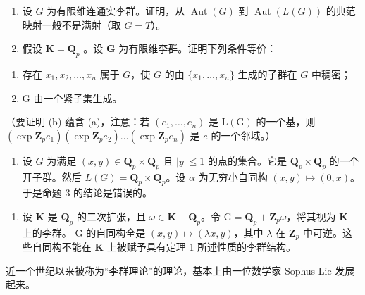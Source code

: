 
\begin{enumerate}
\def\labelenumi{\arabic{enumi}.}
\item
  设 \(G\) 为有限维连通实李群。证明，从 \(\operatorname{Aut}(G)\) 到 \(\operatorname{Aut}(L(G))\) 的典范映射一般不是满射（取 \(G = T\)）。
\item
  假设 \(\mathbf{K} = \mathbf{Q}_p\) 。设 \(\mathbf{G}\) 为有限维李群。证明下列条件等价：
\end{enumerate}

\begin{enumerate}
\def\labelenumi{(\alph{enumi})}
\item
  存在 \(x_{1}, x_{2}, \ldots, x_{n}\) 属于 \(G\)，使 \(G\) 的由 \(\{x_{1}, \ldots, x_{n}\}\) 生成的子群在 \(G\) 中稠密；
\item
  G 由一个紧子集生成。
\end{enumerate}

（要证明 (b) 蕴含 (a)，注意：若 \((e_1, \ldots, e_n)\) 是 \(\mathrm{L}(\mathrm{G})\) 的一个基，则 \((\exp \mathbf{Z}_p e_1)(\exp \mathbf{Z}_p e_2) \ldots (\exp \mathbf{Z}_p e_n)\) 是 \(e\) 的一个邻域。）

\begin{enumerate}
\def\labelenumi{\arabic{enumi}.}
\setcounter{enumi}{2}
\tightlist
\item
  设 \(G\) 为满足 \((x, y) \in \mathbf{Q}_p \times \mathbf{Q}_p\) 且 \(|y| \leqslant 1\) 的点的集合。它是 \(\mathbf{Q}_p \times \mathbf{Q}_p\) 的一个开子群。然后 \(L(G) = \mathbf{Q}_p \times \mathbf{Q}_p\)。设 \(\alpha\) 为无穷小自同构 \((x, y) \mapsto (0, x)\)。于是命题 3 的结论是错误的。
\end{enumerate}

\begin{enumerate}
\def\labelenumi{(\arabic{enumi})}
\setcounter{enumi}{3}
\tightlist
\item
  设 \(\mathbf{K}\) 是 \(\mathbf{Q}_p\) 的二次扩张，且 \(\omega \in \mathbf{K} - \mathbf{Q}_p\)。令 \(\mathrm{G} = \mathbf{Q}_p + \mathbf{Z}_p\omega\)，将其视为 \(\mathbf{K}\) 上的李群。 \(\mathrm{G}\) 的自同构全是 \((x,y)\mapsto (\lambda x,y)\)，其中 \(\lambda\) 在 \(\mathbf{Z}_p\) 中可逆。这些自同构不能在 \(\mathbf{K}\) 上被赋予具有定理 1 所述性质的李群结构。
\end{enumerate}



近一个世纪以来被称为“李群理论”的理论，基本上由一位数学家 Sophus Lie 发展起来。


